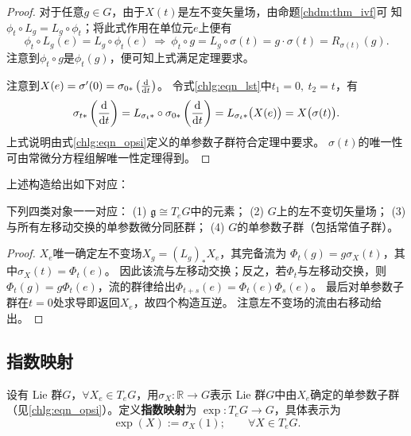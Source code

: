 \begin{proof}
对于任意$g\in G$，由于$X(t)$是左不变矢量场，由命题\ref{chdm:thm_ivf}可
知$\phi_t\circ L_g = L_g\circ \phi_t$；将此式作用在单位元$e$上便有
\begin{equation}
    \phi_t\circ L_g (e)= L_g\circ \phi_t (e) {\ \Rightarrow \ }
    \phi_t\circ g= L_g\circ \sigma(t) = g\cdot \sigma(t) = R_{\sigma(t)}(g).
\end{equation}
注意到$\phi_t\circ g$是$\phi_t(g)$，便可知上式满足定理要求。

    注意到$X(e)=\sigma'(0)=\sigma_{0*}\left(\frac{\dd }{\dd t}\right)$。
令式\eqref{chlg:eqn_lst}中$t_1=0,\ t_2=t$，有
\begin{equation}
    \sigma_{t*}\left( \frac{\dd }{\dd t}\right)
    =L_{\sigma_{t}*}\circ\sigma_{0*}\left(\frac{\dd }{\dd t}\right)
    =L_{\sigma_{t}*}\bigl(X(e)\bigr) = X\bigl(\sigma(t)\bigr).
\end{equation}
上式说明由式\eqref{chlg:eqn_opsi}定义的单参数子群符合定理中要求。
$\sigma(t)$的唯一性可由常微分方程组解唯一性定理得到。
\end{proof}

上述构造给出如下对应：
\begin{theorem}\label{chlg:thm_la4}
下列四类对象一一对应：
(1) $\mathfrak g\cong T_eG$中的元素；
(2) $G$上的左不变切矢量场；
(3) 与所有左移动交换的单参数微分同胚群；
(4) $G$的单参数子群（包括常值子群）。
\end{theorem}
\begin{proof}
$X_e$唯一确定左不变场$X_g=(L_g)_*X_e$，其完备流为
$\Phi_t(g)=g\sigma_X(t)$，其中$\sigma_X(t)=\Phi_t(e)$。
因此该流与左移动交换；反之，若$\Phi_t$与左移动交换，则
$\Phi_t(g)=g\Phi_t(e)$，流的群律给出$\Phi_{t+s}(e)=\Phi_t(e)\Phi_s(e)$。
最后对单参数子群在$t=0$处求导即返回$X_e$，故四个构造互逆。
注意左不变场的流由右移动给出。
\end{proof}

\subsection{指数映射}

\begin{definition}
    设有 Lie 群$G$，$\forall X_e \in T_eG$，用$\sigma_X:\mathbb{R}\to G$表示
     Lie 群$G$中由$X_e$确定的单参数子群（见\eqref{chlg:eqn_opsi}）。定义\textbf{指数映射}为
    $\exp : T_e G \to G$，具体表示为
    \begin{equation}\label{chlg:eqn_exp-map}
        \exp(X) := \sigma_X(1); \qquad \forall X \in T_eG .
    \end{equation}
\end{definition}

